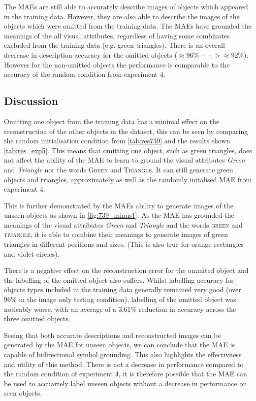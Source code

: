The \acp{MAE} are still able to accurately describe images of objects which appeared in the training data. However, they are also able to describe the images of the objects which were omitted from the training data. The \acp{MAE} have grounded the meanings of the all visual attributes, regardless of having some combinates excluded from the training data (e.g. green triangles). There is an overall decrease in description accuracy for the omitted objects ($\approx 96 \% --> \approx 92 \%$). However for the non-omitted objects the performance is comparable to the accuracy of the random condition from experiment 4.

\subsection{Discussion}
Omitting one object from the training data has a minimal effect on the reconstruction of the other objects in the dataset, this can be seen by comparing the random initialisation condition from \autoref{tab:res739} and the results shown \autoref{tab:res_exp5}. This means that omitting one object, such as green triangles, does not affect the ability of the \ac{MAE} to learn to ground the visual attributes \textit{Green} and \textit{Triangle} nor the words \textsc{Green} and \textsc{Triangle}. It can still generate green objects and triangles, approximately as well as the randomly initalised MAE from experiment 4.

This is further demonstrated by the \acp{MAE} ability to generate images of the unseen objects as shown in \autoref{fig:739_minus1}. As the \ac{MAE} has grounded the meanings of the visual attributes \textit{Green} and \textit{Triangle} and the words \textsc{green} and \textsc{triangle}, it is able to combine their meanings to generate images of green triangles in different positions and sizes. (This is also true for orange rectangles and violet circles).

There is a negative effect on the reconstruction error for the ommited object and the labelling of the omitted object also suffers. Whilst labelling accuracy for objects types included in the training data generally remained very good (over 96\% in the image only testing condition), labelling of the omitted object was noticably worse, with an average of a 3.61\% reduction in accuracy across the three omitted objects.

Seeing that both accurate descriptions and reconstructed images can be generated by the \ac{MAE} for unseen objects, we can conclude that the \ac{MAE} is capable of bidirectional symbol grounding. This also highlights the effectivness and utility of this method. There is not a decrease in performance compared to the random condition of experiment 4, it is therefore possible that the \ac{MAE} can be used to accuartely label unseen objects without a decrease in performance on seen objects.


